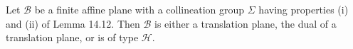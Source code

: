 Let $\mathcal{B}$ be a finite affine plane with a collineation group $\Sigma$ having properties (i) and (ii) of Lemma 14.12. Then $\mathcal{B}$ is either a translation plane, the dual of a translation plane, or is of type $\mathcal{H}$.
